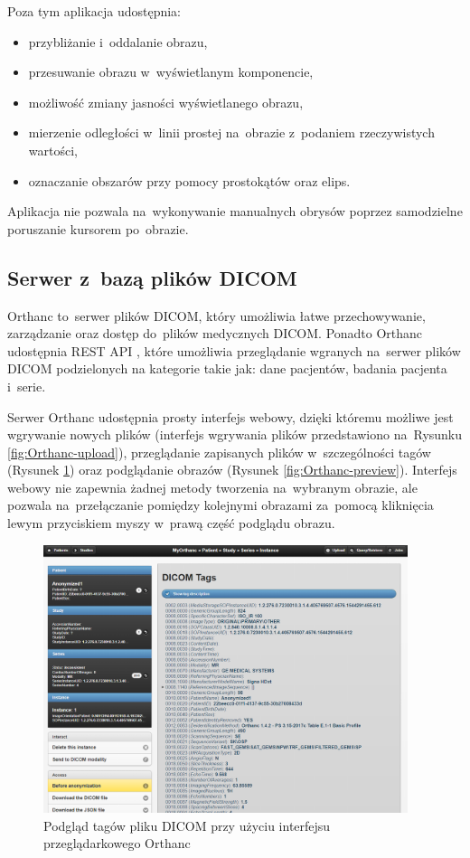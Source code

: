 \documentclass[a4paper,11pt,twoside,openright]{report}
\theoremstyle{definition}
\begin{document}
 Poza tym aplikacja udostępnia:
\begin{itemize}[noitemsep]
\item przybliżanie i~oddalanie obrazu,
\item przesuwanie obrazu w~wyświetlanym komponencie,
\item możliwość zmiany jasności wyświetlanego obrazu,
\item mierzenie odległości w~linii prostej na~obrazie z~podaniem rzeczywistych wartości,
\item oznaczanie obszarów przy pomocy prostokątów oraz elips.
\end{itemize}

Aplikacja nie pozwala na~wykonywanie manualnych obrysów poprzez samodzielne
poruszanie kursorem po~obrazie.

\subsection {Serwer z~bazą plików DICOM}

Orthanc \cite{Orthanc} to~serwer plików DICOM, który umożliwia łatwe przechowywanie,
zarządzanie oraz dostęp do~plików medycznych DICOM. Ponadto Orthanc udostępnia
REST API \cite{Orthanc API}, które umożliwia przeglądanie wgranych na~serwer plików DICOM podzielonych
na kategorie takie jak: dane pacjentów, badania pacjenta i~serie.

Serwer Orthanc udostępnia prosty interfejs webowy, dzięki któremu możliwe jest
wgrywanie nowych plików (interfejs wgrywania plików przedstawiono na~Rysunku
\ref{fig:Orthanc-upload}), przeglądanie zapisanych plików w~szczególności
tagów (Rysunek \ref{fig:Orthanc-tags}) oraz podglądanie obrazów (Rysunek \ref{fig:Orthanc-preview}).
Interfejs webowy nie zapewnia żadnej metody tworzenia na~wybranym obrazie, ale
pozwala na~przełączanie pomiędzy kolejnymi obrazami za~pomocą kliknięcia lewym
przyciskiem myszy w~prawą część podglądu obrazu.

\begin{figure}[tb!]
	\center
	\includegraphics[width=0.95\textwidth]{Orthanc-tags}
	\caption{Podgląd tagów pliku DICOM przy użyciu interfejsu przeglądarkowego Orthanc}
    	\label{fig:Orthanc-tags}
\end{figure}
\end{document}
